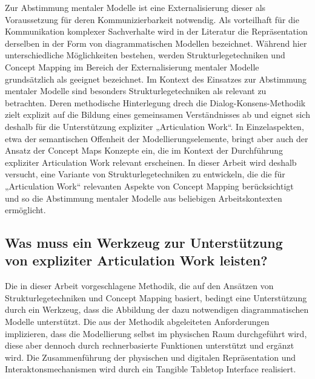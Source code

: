Zur Abstimmung mentaler Modelle ist eine Externalisierung dieser als Voraussetzung für deren Kommunizierbarkeit notwendig. Als vorteilhaft für die Kommunikation komplexer Sachverhalte wird in der Literatur die Repräsentation derselben in der Form von diagrammatischen Modellen bezeichnet. Während hier unterschiedliche Möglichkeiten bestehen, werden Strukturlegetechniken und Concept Mapping im Bereich der Externalisierung mentaler Modelle grundsätzlich als geeignet bezeichnet. Im Kontext des Einsatzes zur Abstimmung mentaler Modelle sind besonders Strukturlegetechniken als relevant zu betrachten. Deren methodische Hinterlegung drech die Dialog-Konsens-Methodik zielt explizit auf die Bildung eines gemeinsamen Verständnisses ab und eignet sich deshalb für die Unterstützung expliziter „Articulation Work“. In Einzelaspekten, etwa der semantischen Offenheit der Modellierungselemente, bringt aber auch der Ansatz der Concept Maps Konzepte ein, die im Kontext der Durchführung expliziter Articulation Work relevant erscheinen. In dieser Arbeit wird deshalb versucht, eine Variante von Strukturlegetechniken zu entwickeln, die die für „Articulation Work“ relevanten Aspekte von Concept Mapping berücksichtigt und so die Abstimmung mentaler Modelle aus beliebigen Arbeitskontexten ermöglicht. 

\subsection{Was muss ein Werkzeug zur Unterstützung von expliziter Articulation Work leisten?}

Die in dieser Arbeit vorgeschlagene Methodik, die auf den Ansätzen von Strukturlegetechniken und Concept Mapping basiert, bedingt eine Unterstützung durch ein Werkzeug, dass die Abbildung der dazu notwendigen diagrammatischen Modelle unterstützt. Die aus der Methodik abgeleiteten Anforderungen implizieren, dass die Modellierung selbst im physischen Raum durchgeführt wird, diese aber dennoch durch rechnerbasierte Funktionen unterstützt und ergänzt wird. Die Zusammenführung der physischen und digitalen Repräsentation und Interaktonsmechanismen wird durch ein Tangible Tabletop Interface realisiert.

